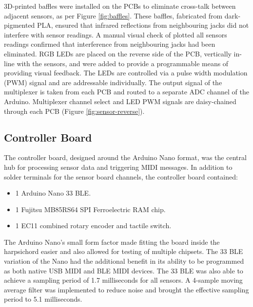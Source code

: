 3D-printed baffles were installed on the PCBs to eliminate cross-talk between adjacent sensors, as per Figure \ref{fig:baffles}. These baffles, fabricated from dark-pigmented PLA, ensured that infrared reflections from neighbouring jacks did not interfere with sensor readings. A manual visual check of plotted all sensors readings confirmed that interference from neighbouring jacks had been eliminated. RGB LEDs are placed on the reverse side of the PCB, vertically in-line with the sensors, and were added to provide a programmable means of providing visual feedback. The LEDs are controlled via a pulse width modulation (PWM) signal and are addressable individually.
The output signal of the multiplexer is taken from each PCB and routed to a separate ADC channel of the Arduino. Multiplexer channel select and LED PWM signals are daisy-chained through each PCB (Figure \ref{fig:sensor-reverse}).

\subsection{Controller Board}\label{controller-board}

The controller board, designed around the Arduino Nano format, was the central hub for processing sensor data and triggering MIDI messages. In addition to solder terminals for the sensor board channels, the controller board contained:



\begin{itemize}
    \item 1 Arduino Nano 33 BLE.
    \item 1 Fujitsu MB85RS64 SPI Ferroelectric RAM chip.
    \item 1 EC11 combined rotary encoder and tactile switch.
\end{itemize}


The Arduino Nano's small form factor made fitting the board inside the harpsichord easier and also allowed for testing of multiple chipsets. The 33 BLE variation of the Nano had the additional benefit in its ability to be programmed as both native USB MIDI and BLE MIDI devices. The 33 BLE was also able to achieve a sampling period of 1.7 milliseconds for all sensors. A 4-sample moving average filter was implemented to reduce noise and brought the effective sampling period to 5.1 milliseconds.



